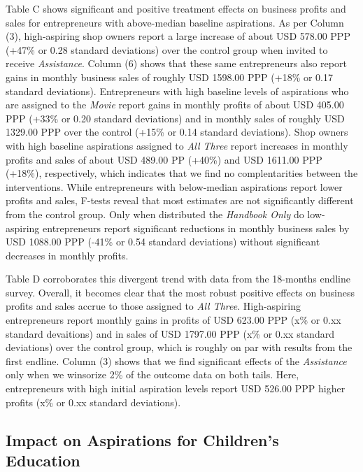 \documentclass[11.5pt]{article}
\begin{document}
Table C shows significant and positive treatment effects on business profits and sales for entrepreneurs with above-median baseline aspirations. As per Column (3), high-aspiring shop owners report a large increase of about USD 578.00 PPP (+47\% or 0.28 standard deviations) over the control group when invited to receive \emph{Assistance}. Column (6) shows that these same entrepreneurs also report gains in monthly business sales of roughly USD 1598.00 PPP (+18\% or 0.17 standard deviations). Entrepreneurs with high baseline levels of aspirations who are assigned to the \emph{Movie} report gains in monthly profits of about USD 405.00 PPP (+33\% or 0.20 standard deviations) and in monthly sales of roughly USD 1329.00 PPP over the control (+15\% or 0.14 standard deviations). Shop owners with high baseline aspirations assigned to \emph{All Three} report increases in monthly profits and sales of about USD 489.00 PP (+40\%) and USD 1611.00 PPP (+18\%), respectively, which indicates that we find no complentarities between the interventions. While entrepreneurs with below-median aspirations report lower profits and sales, F-tests reveal that most estimates are not significantly different from the control group. Only when distributed the \emph{Handbook Only} do low-aspiring entrepreneurs report significant reductions in monthly business sales by USD 1088.00 PPP (-41\% or 0.54 standard deviations) without significant decreases in monthly profits.

Table D corroborates this divergent trend with data from the 18-months endline survey. Overall, it becomes clear that the most robust positive effects on business profits and sales accrue to those assigned to \emph{All Three}. High-aspiring entrepreneurs report monthly gains in profits of USD 623.00 PPP (x\% or 0.xx standard devaitions) and in sales of USD 1797.00 PPP (x\% or 0.xx standard deviations) over the control group, which is roughly on par with results from the first endline. Column (3) shows that we find significant effects of the \emph{Assistance} only when we winsorize 2\% of the outcome data on both tails. Here, entrepreneurs with high initial aspiration levels report USD 526.00 PPP higher profits (x\% or 0.xx standard deviations).

\subsection{Impact on Aspirations for Children's Education}
\end{document}
